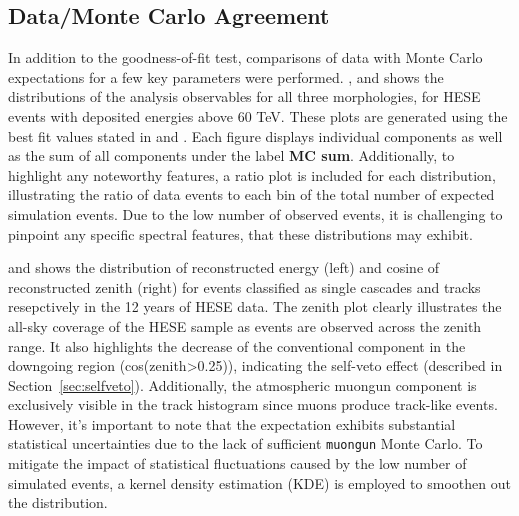 \subsection{Data/Monte Carlo Agreement}
\label{sec:data_mc}
In addition to the goodness-of-fit test, comparisons of data with Monte Carlo expectations for a few key parameters were performed. ,  and  shows the distributions of the analysis observables for all three morphologies, for HESE events with deposited energies above 60 TeV. These plots are generated using the best fit values stated in  and . Each figure displays individual components as well as the sum of all components under the label \textbf{MC sum}. Additionally, to highlight any noteworthy features, a ratio plot is included for each distribution, illustrating the ratio of data events to each bin of the total number of expected simulation events. Due to the low number of observed events, it is challenging to pinpoint any specific spectral features, that these distributions may exhibit. 

 and  shows the distribution of reconstructed energy (left) and cosine of reconstructed zenith (right) for events classified as single cascades and tracks resepctively in the 12 years of HESE data. The zenith plot clearly illustrates the all-sky coverage of the HESE sample as events are observed across the zenith range. It also highlights the decrease of the conventional component in the downgoing region (cos(zenith>0.25)), indicating the self-veto effect (described in Section~\ref{sec:selfveto}). Additionally, the atmospheric muongun component is exclusively visible in the track histogram since muons produce track-like events. However, it's important to note that the expectation exhibits substantial statistical uncertainties due to the lack of sufficient \texttt{muongun} Monte Carlo. To mitigate the impact of statistical fluctuations caused by the low number of simulated events, a kernel density estimation (KDE) is employed to smoothen out the distribution. 

